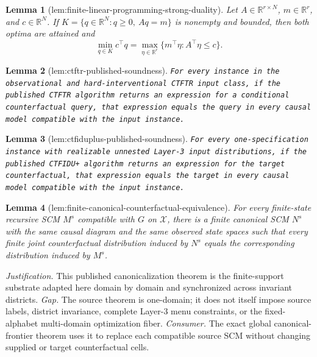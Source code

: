 \documentclass{article}
\newtheorem{lemma}{Lemma}
\begin{document}
\begin{lemma}[lem:finite-linear-programming-strong-duality]\label{lem:finite-linear-programming-strong-duality}
Let \(A\in\mathbb R^{r\times N}\), \(m\in\mathbb R^r\), and \(c\in\mathbb R^N\). If \(K=\{q\in\mathbb R^N:q\geq0,\ Aq=m\}\) is nonempty and bounded, then both optima are attained and
\[
 \min_{q\in K}c^\top q
 =\max_{\eta\in\mathbb R^r}\{m^\top\eta:A^\top\eta\leq c\}.
\]
\end{lemma}

\begin{lemma}[lem:ctftr-published-soundness]\label{lem:ctftr-published-soundness}
\texttt{For every instance in the observational and hard-\allowbreak{}interventional CTFTR input class,\allowbreak{} if the published CTFTR algorithm returns an expression for a conditional counterfactual query,\allowbreak{} that expression equals the query in every causal model compatible with the input instance.}
\end{lemma}

\begin{lemma}[lem:ctfiduplus-published-soundness]\label{lem:ctfiduplus-published-soundness}
\texttt{For every one-\allowbreak{}specification instance with realizable unnested Layer-\allowbreak{}3 input distributions,\allowbreak{} if the published CTFIDU+\allowbreak{} algorithm returns an expression for the target counterfactual,\allowbreak{} that expression equals the target in every causal model compatible with the input instance.}
\end{lemma}

\begin{lemma}[lem:finite-canonical-counterfactual-equivalence]\label{lem:finite-canonical-counterfactual-equivalence}
For every finite-state recursive SCM \(M^s\) compatible with \(G\) on \(\mathcal X\), there is a finite canonical SCM \(N^s\) with the same causal diagram and the same observed state spaces such that every finite joint counterfactual distribution induced by \(N^s\) equals the corresponding distribution induced by \(M^s\).
\end{lemma}
\par\smallskip\noindent \textit{Justification.} This published canonicalization theorem is the finite-support substrate adapted here domain by domain and synchronized across invariant districts. \textit{Gap.} The source theorem is one-domain; it does not itself impose source labels, district invariance, complete Layer-3 menu constraints, or the fixed-alphabet multi-domain optimization fiber. \textit{Consumer.} The exact global canonical-frontier theorem uses it to replace each compatible source SCM without changing supplied or target counterfactual cells.
\end{document}
